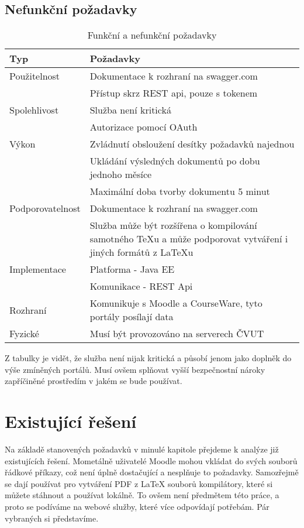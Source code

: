  \subsection{Nefunkční požadavky}
 
 \begin{table}[H]
 	\begin{center}
 		\begin{tabular}{ p{4cm} P{8,6cm} }
 			\textbf{Typ} & \textbf{Požadavky} \\
 			\midrule[0,15em]
 			Použitelnost & \tabitem Dokumentace k rozhraní na swagger.com\\
 						& \tabitem Přístup skrz REST api, pouze s tokenem\\
 			\midrule		
 			Spolehlivost & \tabitem Služba není kritická\\
 										& \tabitem Autorizace pomocí OAuth\\
 			\midrule
 			Výkon & \tabitem Zvládnutí obsloužení desítky požadavků najednou\\
 						& \tabitem Ukládání výsledných dokumentů po dobu jednoho měsíce\\
 						& \tabitem Maximální doba tvorby dokumentu 5 minut\\	
			\midrule
			Podporovatelnost & \tabitem Dokumentace k rozhraní na swagger.com\\
							& \tabitem Služba může být rozšířena o kompilování samotného TeXu a může podporovat vytváření i jiných formátů z LaTeXu\\	
			\midrule
			Implementace & \tabitem Platforma - Java EE\\
						& \tabitem Komunikace - REST Api\\
			\midrule
 			Rozhraní & \tabitem Komunikuje s Moodle a CourseWare, tyto portály posílají data\\
 			\midrule
 			Fyzické & \tabitem Musí být provozováno na serverech ČVUT
 	\end{tabular}
 	\end{center}
 	\caption{Funkční a nefunkční požadavky}
 	\label{tab:errors}
 \end{table}
 
 Z tabulky je vidět, že služba není nijak kritická a působí jenom jako doplněk do výše zmíněných portálů. Musí ovšem splňovat vyšší bezpečnostní nároky zapříčiněné prostředím v jakém se bude používat. 

\section{Existující řešení}
Na základě stanovených požadavků v minulé kapitole přejdeme k analýze již existujících řešení. Mometálně uživatelé Moodle mohou vkládat do svých souborů řádkové příkazy, což není úplně dostačující a nesplňuje to požadavky. Samozřejmě se dají používat pro vytváření PDF z LaTeX souborů kompilátory, které si můžete stáhnout a používat lokálně. To ovšem není předmětem této práce, a proto se podíváme na webové služby, které více odpovídají potřebám. Pár vybraných si představíme.  

